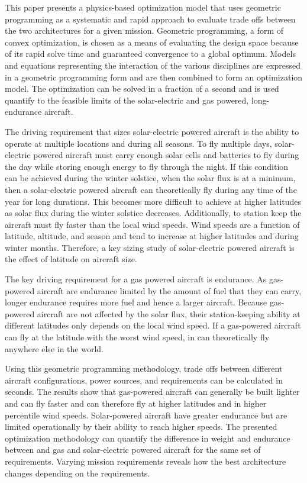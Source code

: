 This paper presents a physics-based optimization model that uses geometric programming as a systematic and rapid approach to evaluate trade offs between the two architectures for a given mission.  Geometric programming, a form of convex optimization, is chosen as a means of evaluating the design space because of its rapid solve time and guaranteed convergence to a global optimum.\cite{gp}
Models and equations representing the interaction of the various disciplines are expressed in a geometric programming form and are then combined to form an optimization model. 
The optimization can be solved in a fraction of a second and is used quantify to the feasible limits of the solar-electric and gas powered, long-endurance aircraft. 

The driving requirement that sizes solar-electric powered aircraft is the ability to operate at multiple locations and during all seasons.  
To fly multiple days, solar-electric powered aircraft must carry enough solar cells and batteries to fly during the day while storing enough energy to fly through the night.\cite{solartech}
If this condition can be achieved during the winter solstice, when the solar flux is at a minimum, then a solar-electric powered aircraft can theoretically fly during any time of the year for long durations.\cite{solartech}
This becomes more difficult to achieve at higher latitudes as solar flux during the winter solstice decreases.  
Additionally, to station keep the aircraft must fly faster than the local wind speeds.  
Wind speeds are a function of latitude, altitude, and season and tend to increase at higher latitudes and during winter months. 
Therefore, a key sizing study of solar-electric powered aircraft is the effect of latitude on aircraft size.  

The key driving requirement for a gas powered aircraft is endurance.  
As gas-powered aircraft are endurance limited by the amount of fuel that they can carry, longer endurance requires more fuel and hence a larger aircraft.  
Because gas-powered aircraft are not affected by the solar flux, their station-keeping ability at different latitudes only depends on the local wind speed. 
If a gas-powered aircraft can fly at the latitude with the worst wind speed, in can theoretically fly anywhere else in the world.  

Using this geometric programming methodology, trade offs between different aircraft configurations, power sources, and requirements can be calculated in seconds.  
The results show that gas-powered aircraft can generally be built lighter and can fly faster and can therefore fly at higher latitudes and in higher percentile wind speeds.  
Solar-powered aircraft have greater endurance but are limited operationally by their ability to reach higher speeds.  
The presented optimization methodology can quantify the difference in weight and endurance between and gas and solar-electric powered aircraft for the same set of requirements. 
Varying mission requirements reveals how the best architecture changes depending on the requirements. 

